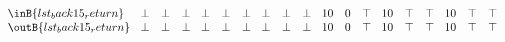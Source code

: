 \begin{minipage}{5in}
\begin{math}
\begin{array}{l@{\phantom{X}}ccc@{\phantom{X}}ccc@{\phantom{X}}ccc@{\phantom{X}}ccc@{\phantom{X}}ccc@{\phantom{X}}ccc}
    \inB{lst_back15_return} & %
    \bot & \bot & \bot & %
    \bot & \bot & \bot & %
    \bot & \bot & \bot & %
    10 & 0 & \top & %
    10 & \top & \top & %
    10 & \top & \top \\ %
    \outB{lst_back15_return} & %
    \bot & \bot & \bot & %
    \bot & \bot & \bot & %
    \bot & \bot & \bot & %
    10 & 0 & \top & %
    10 & \top & \top & %
    10 & \top & \top \\\\ %

  \end{array}
\end{math}
\end{minipage}
